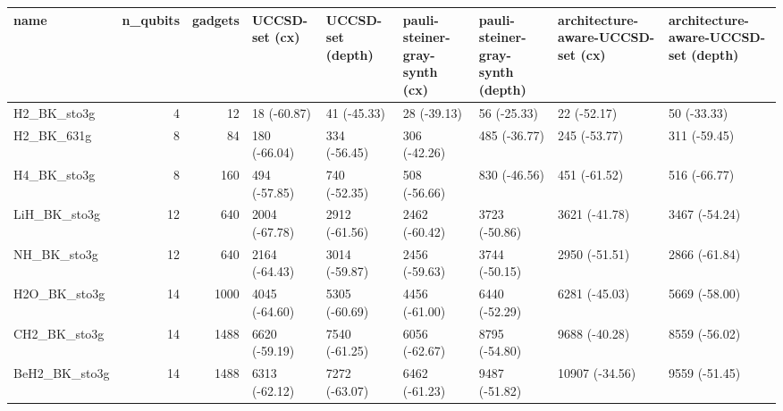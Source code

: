 \begin{tabular}{lrrllllll}
\toprule
name & n\_qubits & gadgets & UCCSD-set (cx) & UCCSD-set (depth) & pauli-steiner-gray-synth (cx) & pauli-steiner-gray-synth (depth) & architecture-aware-UCCSD-set (cx) & architecture-aware-UCCSD-set (depth) \\
\midrule
H2\_BK\_sto3g & 4 & 12 & 18 (-60.87) & 41 (-45.33) & 28 (-39.13) & 56 (-25.33) & 22 (-52.17) & 50 (-33.33) \\
H2\_BK\_631g & 8 & 84 & 180 (-66.04) & 334 (-56.45) & 306 (-42.26) & 485 (-36.77) & 245 (-53.77) & 311 (-59.45) \\
H4\_BK\_sto3g & 8 & 160 & 494 (-57.85) & 740 (-52.35) & 508 (-56.66) & 830 (-46.56) & 451 (-61.52) & 516 (-66.77) \\
LiH\_BK\_sto3g & 12 & 640 & 2004 (-67.78) & 2912 (-61.56) & 2462 (-60.42) & 3723 (-50.86) & 3621 (-41.78) & 3467 (-54.24) \\
NH\_BK\_sto3g & 12 & 640 & 2164 (-64.43) & 3014 (-59.87) & 2456 (-59.63) & 3744 (-50.15) & 2950 (-51.51) & 2866 (-61.84) \\
H2O\_BK\_sto3g & 14 & 1000 & 4045 (-64.60) & 5305 (-60.69) & 4456 (-61.00) & 6440 (-52.29) & 6281 (-45.03) & 5669 (-58.00) \\
CH2\_BK\_sto3g & 14 & 1488 & 6620 (-59.19) & 7540 (-61.25) & 6056 (-62.67) & 8795 (-54.80) & 9688 (-40.28) & 8559 (-56.02) \\
BeH2\_BK\_sto3g & 14 & 1488 & 6313 (-62.12) & 7272 (-63.07) & 6462 (-61.23) & 9487 (-51.82) & 10907 (-34.56) & 9559 (-51.45) \\
\bottomrule
\end{tabular}
